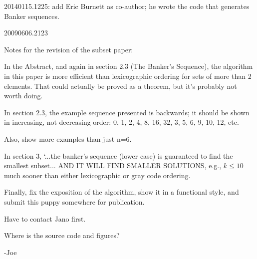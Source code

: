 20140115.1225: add Eric Burnett as co-author; he wrote the code
that generates Banker sequences.



20090606.2123

Notes for the revision of the subset paper:

In the Abstract, and again in section 2.3 (The Banker's Sequence),
the algorithm in this paper is more efficient than lexicographic
ordering for sets of more than 2 elements.  That could actually
be proved as a theorem, but it's probably not worth doing.

In section 2.3, the example sequence presented is backwards; it
should be shown in increasing, not decreasing order: 0, 1, 2, 4,
8, 16, 32, 3, 5, 6, 9, 10, 12, etc.

Also, show more examples than just n=6.

In section 3, `...the banker's sequence (lower case) is guaranteed
to find the smallest subset... AND IT WILL FIND SMALLER SOLUTIONS,
e.g., $k \le 10$ much sooner than either lexicographic or gray code
ordering.

Finally, fix the exposition of the algorithm, show it in a
functional style, and submit this puppy somewhere for publication.

Have to contact Jano first.

Where is the source code and figures?

-Joe

